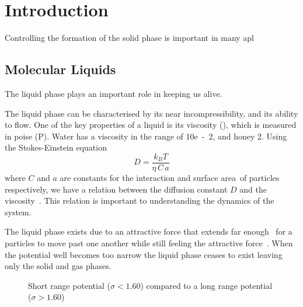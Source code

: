 
\chapter{Introduction}

Controlling the formation of the solid phase is important in many apl



\cite{de-yoreo:03}

\section{Molecular Liquids}
The liquid phase plays an important role in keeping us alive.

The liquid phase can be characterised by its near incompressibility, and its ability to flow. One of the key properties of a liquid is its viscosity (\eta), which is measured in poise (P). Water has a viscosity in the range of \si{10e-2}{\poise}, and honey \si{2}{\poise}. Using the Stokes-Einstein equation
\begin{equation}
    D=\frac{k_B T}{\eta\,C\,a}
\end{equation}
where $C$ and $a$ are constants for the interaction and surface area~\tocheck of particles respectively, we have a relation between the diffusion constant $D$ and the viscosity~\tocite. This relation is important to understanding the dynamics of the system.

The liquid phase exists due to an attractive force that extends far enough~ for a particles to move past one another while still feeling the attractive force~\cite{tejero:94}. When the potential well becomes too narrow the liquid phase ceases to exist leaving only the solid and gas phases.

\begin{figure}
    \label{fig:potentials}
    \caption{Short range potential ($\sigma < 1.60$) compared to a long range potential ($\sigma > 1.60$)}
\end{figure}

